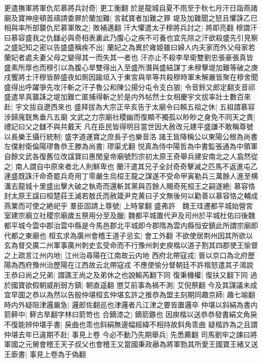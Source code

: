 更遣撫軍將軍仇尼慕將兵討奇|{
	更工衡翻}
於是龍城自夏不雨至于秋七月汗日詣燕諸廟及寶神座頓首禱請委罪於蘭加難|{
	言弑寶者加難之罪}
堤及加難聞之怒且懼誅乙巳相與率所部襲仇尼慕軍敗之|{
	敗補邁翻}
汗大懼遣太子穆將兵討之|{
	將即亮翻}
穆謂汗曰慕容盛我之仇讎必與奇相表裏此乃腹心之疾不可養也宜先除之汗欲殺盛先引見察之盛妃知之密以告盛盛稱疾不出|{
	蘭妃之為異於雍姬雖曰婦人内夫家而外父母家若蘭妃者處夫妻父母之變得其一而失其一者也}
汗亦止不殺李旱衛雙劉忠張豪張真皆盛素所厚也而穆引以為腹心旱雙得出入至盛所潛與盛結謀丁未穆擊堤加難等破之庚戌饗將士汗穆皆醉盛夜如厠因踰垣入于東宮與旱等共殺穆時軍未解嚴皆聚在穆舍聞盛得出呼躍爭先攻汗斬之汗子魯公和陳公揚分屯令支白狼|{
	令音鈴又郎定翻支音祁}
盛遣旱真襲誅之堤加難亡匿捕得斬之於是内外帖然士女相慶宇文拔率壯士數百來赴|{
	宇文拔自遼西來也}
盛拜拔為大宗正辛亥告于太廟令曰賴五祖之休|{
	五祖謂慕容涉歸廆皝雋垂凡五廟}
文武之力宗廟社稷幽而復顯不獨孤以眇眇之身免不同天之責|{
	禮記曰父之讎不與共戴天}
凡在臣民皆得明目當世因大赦改元建平盛謙不敢稱尊號以長樂王攝行統制|{
	盛字道運寶之庶長子也樂音洛}
諸王皆降稱公以東陽公根為尚書左僕射衛倫陽璆魯恭王滕為尚書|{
	璆渠尤翻}
悦真為侍中陽哲為中書監張通為中領軍自餘文武各復舊位改諡寶曰惠閔皇帝廟號烈宗初太原王奇舉兵建安南北之人翕然從之|{
	南人謂自中原來者北人則鮮卑也}
蘭汗遣其兄子全討奇奇擊滅之匹馬不返進屯乙連盛既誅汗命奇罷兵奇用丁零嚴生烏桓王龍之謀遂不受命甲寅勒兵三萬餘人進至横溝去龍城十里盛出擊大破之執奇而還斬其黨與百餘人賜奇死桓王之嗣遂絶|{
	慕容恪封太原王諡曰桓楚莊王滅若敖氏而赦箴尹克黄曰子文無後何以勸善以慕容恪之輔成燕業而可使之絶祀乎}
羣臣固請上尊號|{
	上時掌翻}
盛弗許　魏王珪遷都平城始營宮室建宗廟立社稷宗廟歲五祭用分至及臘|{
	魏都平城置代尹及司州於平城杜佑曰後魏都平城今雲中郡治雲中縣是今馬邑郡北平城即今郡隋為雲内縣恒安鎮此所謂宗廟即代都之東廟也}
桓玄求為廣州會稽王道子忌玄|{
	會工外翻}
不欲使居荆州因其所欲以玄為督交廣二州軍事廣州刺史玄受命而不行豫州刺史庾楷以道子割其四郡使王愉督之上疏言江州内地|{
	江州治尋陽在江南故云内地}
西府北帶寇戎|{
	晉以京口為北府歷陽為西府豫州治歷陽在江西故云北帶寇戎}
不應使愉分督朝廷不許楷怒遣其子鴻說王恭曰尚之兄弟|{
	謂譙王尚之及弟休之也說輸芮翻下同}
復秉機權|{
	復扶又翻下同}
過於國寶欲假朝威削弱方鎮|{
	朝直遥翻}
懲艾前事為禍不測|{
	艾倪祭翻}
今及其謀議未成宜早圖之恭以為然以告殷仲堪桓玄仲堪玄許之推恭為盟主刻期同趣京師|{
	趣七喻翻}
時内外疑阻津邏嚴急|{
	邏郎佐翻巡也津邏者凡江津之要皆置邏卒}
仲堪以斜絹為書内箭簳中|{
	簳古旱翻字林曰箭笴也}
合鏑漆之|{
	鏑箭鏃也}
因庾楷以送恭恭發書絹文角戾不復能辨仲堪手書|{
	戾曲也乖也斜絹無邊幅經緯不相持故斜角乖曲}
疑楷詐為之且謂仲堪去年已違期不赴|{
	事見上卷}
今必不動乃先期舉兵|{
	先悉薦翻}
司馬劉牢之諫曰將軍國之元舅會稽王天子叔父也會稽王又當國秉政曏為將軍勠其所愛王國寶王緒又送王廞書|{
	事見上卷為于偽翻}
